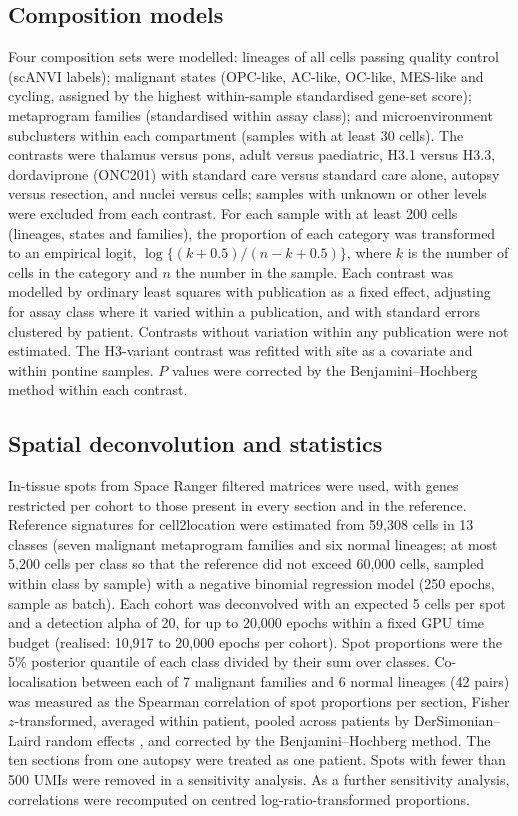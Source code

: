 \documentclass[11pt,a4paper]{article}
\begin{document}
\subsection{Composition models}
Four composition sets were modelled: lineages of all cells passing quality control (scANVI labels); malignant states
(OPC-like, AC-like, OC-like, MES-like and cycling, assigned by the highest within-sample standardised gene-set score);
metaprogram families (standardised within assay class); and microenvironment subclusters within each compartment
(samples with at least 30 cells). The contrasts were thalamus versus pons, adult versus paediatric, H3.1 versus H3.3,
dordaviprone (ONC201) with standard care versus standard care alone, autopsy versus resection, and nuclei versus cells;
samples with unknown or other levels were excluded from each contrast. For each sample with at least 200 cells (lineages,
states and families), the proportion of each category was transformed to an empirical logit,
$\log\{(k + 0.5)/(n - k + 0.5)\}$, where $k$ is the number of cells in the category and $n$ the number in the sample. Each
contrast was modelled by ordinary least squares with publication as a fixed effect, adjusting for assay class where it
varied within a publication, and with standard errors clustered by patient. Contrasts without variation within any
publication were not estimated. The H3-variant contrast was refitted with site as a covariate and within pontine samples.
$P$ values were corrected by the Benjamini--Hochberg method \citep{benjamini1995controlling} within each contrast.

\subsection{Spatial deconvolution and statistics}
In-tissue spots from Space Ranger filtered matrices were used, with genes restricted per cohort to those present in every
section and in the reference. Reference signatures for cell2location \citep{kleshchevnikov2022celllocation} were estimated
from 59,308 cells in 13 classes (seven malignant metaprogram families and six normal lineages; at most 5,200 cells per
class so that the reference did not exceed 60,000 cells, sampled within class by sample) with a negative binomial
regression model (250 epochs, sample as batch). Each cohort was deconvolved with an expected 5 cells per spot and a
detection alpha of 20, for up to 20,000 epochs within a fixed GPU time budget (realised: 10,917 to 20,000 epochs per
cohort). Spot proportions were the 5\% posterior quantile of each class
divided by their sum over classes. Co-localisation between each of 7 malignant families and 6 normal lineages (42 pairs) was
measured as the Spearman correlation of spot proportions per section, Fisher $z$-transformed, averaged within patient,
pooled across patients by DerSimonian--Laird random effects \citep{dersimonian1986meta}, and corrected by the
Benjamini--Hochberg method. The ten sections from one autopsy were treated as one patient. Spots with fewer
than 500 UMIs were removed in a sensitivity analysis. As a further sensitivity analysis, correlations were
recomputed on centred log-ratio-transformed proportions.
\end{document}
